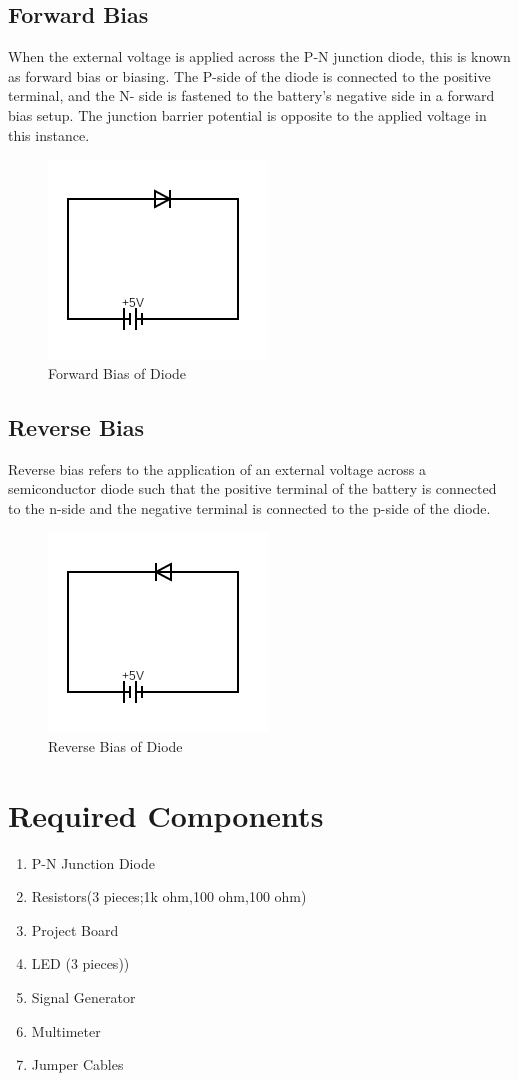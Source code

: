 \subsection{Forward Bias}
When the external voltage is applied across the P-N junction diode, this is known as forward
bias or biasing. The P-side of the diode is connected to the positive terminal, and the N-
side is fastened to the battery’s negative side in a forward bias setup. The junction barrier
potential is opposite to the applied voltage in this instance.
\begin{figure}[H]
    \centering
    \includegraphics[scale=0.6]{src/exp02/circuit (3).png}
    \caption{Forward Bias of Diode}
\end{figure}
\subsection{Reverse Bias}
Reverse bias refers to the application of an external voltage across a semiconductor diode
such that the positive terminal of the battery is connected to the n-side and the negative
terminal is connected to the p-side of the diode.
\begin{figure}[H]
    \centering
    \includegraphics[scale=0.6]{src/exp02/circuit (4).png}
    \caption{Reverse Bias of Diode}
\end{figure}

\section{Required Components}
\begin{enumerate}
    \item P-N Junction Diode
    \item Resistors(3 pieces;1k ohm,100 ohm,100 ohm)
    \item Project Board
    \item LED (3 pieces))
    \item Signal Generator
    \item Multimeter
    \item Jumper Cables
\end{enumerate}

